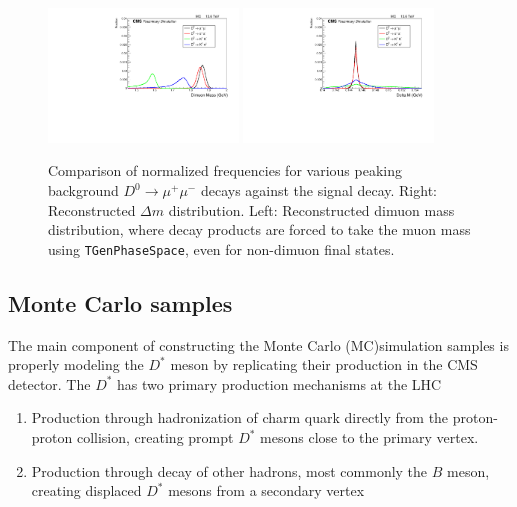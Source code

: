 \begin{figure}[htp]
    \begin{center}
      \includegraphics[width=0.45\textwidth]{figures/chapter4/reconstructed_D0_mass.pdf}
      \includegraphics[width=0.45\textwidth]{figures/chapter4/reconstructed_delta_m.pdf}\\
    \end{center}
    \caption{
      Comparison of normalized frequencies for various peaking background $D^0 \to \mu^+ \mu^-$ decays against the signal decay.
      Right: Reconstructed $\Delta m$ distribution.
      Left: Reconstructed dimuon mass distribution, where decay products are forced to take the muon mass using \texttt{TGenPhaseSpace}, even for non-dimuon final states.
    }
    \label{fig:reconstructed_D0_comparison}
  \end{figure}
  
  


\subsection{Monte Carlo samples}

The main component of constructing the Monte Carlo (MC)simulation samples is properly modeling the $D^*$ meson by replicating their production in the CMS detector. The $D^*$ has two primary production mechanisms at the LHC
\begin{enumerate}
    \item Production through hadronization of charm quark directly from the proton-proton collision, creating prompt $D^*$ mesons close to the primary vertex. 
    \item Production through decay of other hadrons, most commonly the $B$ meson, creating displaced $D^*$ mesons from a secondary vertex
\end{enumerate}

